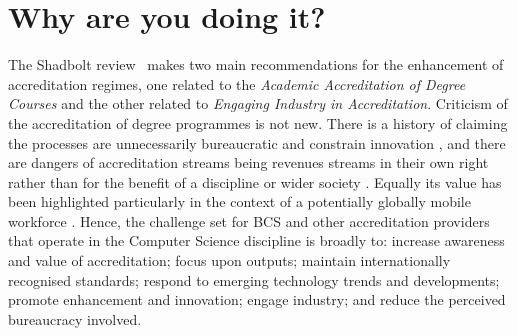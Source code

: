 \documentclass[sigconf]{acmart}
\begin{document}
\section {Why are you doing it?}	

The Shadbolt review~\cite[p.~8]{shadbolt2016shadbolt} makes two main
recommendations for the enhancement of accreditation regimes, one
related to the {\emph{Academic Accreditation of Degree Courses}} and
the other related to {\emph{Engaging Industry in
Accreditation}}. Criticism of the accreditation of degree programmes
is not new. There is a history of claiming the processes are
unnecessarily bureaucratic and constrain innovation \cite{Harvey2004},
and there are dangers of accreditation streams being revenues streams
in their own right rather than for the benefit of a discipline or
wider society \cite{Knight_2015}. Equally its value has been
highlighted particularly in the context of a potentially globally
mobile workforce \cite{Knight_2015}. Hence, the challenge set for BCS
and other accreditation providers that operate in the Computer Science
discipline is broadly to: increase awareness and value of
accreditation; focus upon outputs; maintain internationally recognised
standards; respond to emerging technology trends and developments;
promote enhancement and innovation; engage industry; and reduce the
perceived bureaucracy involved.


	


\end{document}
